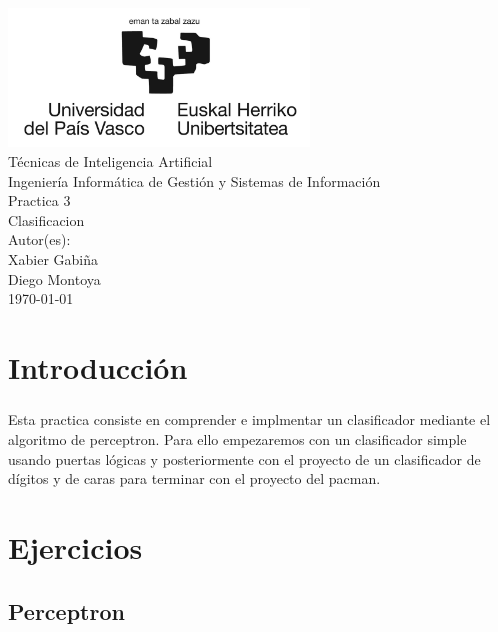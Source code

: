 \documentclass{report}
\begin{document}
    \begin{titlepage}
        \centering
        \includegraphics[width=0.6\textwidth]{./.img/logo.jpg}\\
        \vspace{1cm}
        \LARGE Técnicas de Inteligencia Artificial\\
        \vspace{0.5cm}
        \Large Ingeniería Informática de Gestión y Sistemas de Información\\
        \vspace{3cm}
        \Huge Practica 3\\
        \huge Clasificacion\\
        \vspace{2.5cm}
        \Large Autor(es):\\
        \vspace{0.2cm}
        \large Xabier Gabiña\\
        \large Diego Montoya\\
        \vfill
        \today
    \end{titlepage}
    \tableofcontents
    \listoffigures
    \listoftables
    \lstlistoflistings
    \chapter{Introducción}
      \paragraph*{}{
        Esta practica consiste en comprender e implmentar un clasificador mediante el algoritmo de perceptron.
        Para ello empezaremos con un clasificador simple usando puertas lógicas y posteriormente con el proyecto de un clasificador de dígitos y de caras para terminar con el proyecto del pacman.
      }
    \chapter{Ejercicios}
      \section{Perceptron}
\end{document}
